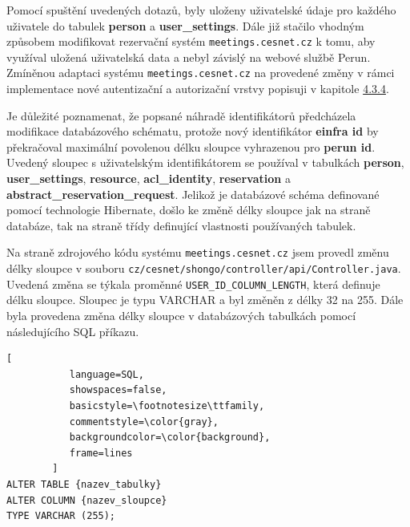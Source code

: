 \documentclass[
  printed, %
  twoside, %
  table,   %
  nolof,     %
  nolot,     %
]{fithesis3}
\begin{document}
Pomocí spuštění uvedených dotazů, byly uloženy uživatelské údaje pro každého uživatele do tabulek \textbf{person} a \textbf{user\_settings}. Dále již stačilo vhodným způsobem modifikovat rezervační systém \texttt{meetings.cesnet.cz} k tomu, aby využíval uložená uživatelská data a nebyl závislý na webové službě Perun. Zmíněnou adaptaci systému \texttt{meetings.cesnet.cz} na provedené změny v rámci implementace nové autentizační a autorizační vrstvy popisuji v kapitole \hyperref[ShongoImpl-web]{4.3.4}. 

\par

Je důležité poznamenat, že popsané náhradě identifikátorů předcházela modifikace databázového schématu, protože nový identifikátor \textbf{einfra id} by překračoval maximální povolenou délku sloupce vyhrazenou pro \textbf{perun id}. Uvedený sloupec s uživatelským identifikátorem se používal v tabulkách \textbf{person}, \textbf{user\_settings}, \textbf{resource}, \textbf{acl\_identity}, \textbf{reservation} a \textbf{abstract\_reservation\_request}. Jelikož je databázové schéma definované pomocí technologie Hibernate, došlo ke změně délky sloupce jak na straně databáze, tak na straně třídy definující vlastnosti používaných tabulek. 

\par  

Na straně zdrojového kódu systému \texttt{meetings.cesnet.cz} jsem provedl změnu délky sloupce v souboru \texttt{cz/cesnet/shongo/controller/api/Controller.java}. Uvedená změna se týkala proměnné \texttt{USER\_ID\_COLUMN\_LENGTH}, která definuje délku sloupce. Sloupec je typu VARCHAR a byl změněn z délky 32 na 255. Dále byla provedena změna délky sloupce v databázových tabulkách pomocí následujícího SQL příkazu.

\begin{lstlisting}[
           language=SQL,
           showspaces=false,
           basicstyle=\footnotesize\ttfamily,
           commentstyle=\color{gray},
           backgroundcolor=\color{background},
           frame=lines
        ]
ALTER TABLE {nazev_tabulky}  
ALTER COLUMN {nazev_sloupce}
TYPE VARCHAR (255);
\end{lstlisting}

\par
\end{document}
